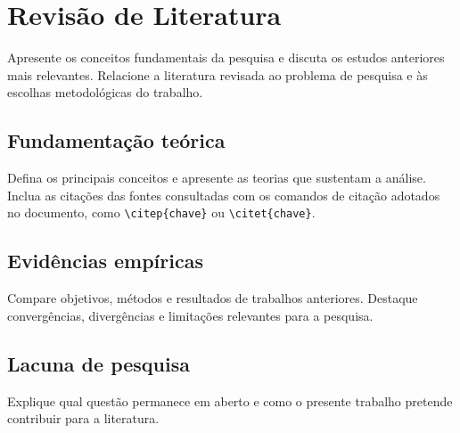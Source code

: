 \chapter{Revisão de Literatura}

Apresente os conceitos fundamentais da pesquisa e discuta os estudos anteriores
mais relevantes. Relacione a literatura revisada ao problema de pesquisa e às
escolhas metodológicas do trabalho.

\section{Fundamentação teórica}

Defina os principais conceitos e apresente as teorias que sustentam a análise.
Inclua as citações das fontes consultadas com os comandos de citação adotados no
documento, como \verb|\citep{chave}| ou \verb|\citet{chave}|.

\section{Evidências empíricas}

Compare objetivos, métodos e resultados de trabalhos anteriores. Destaque
convergências, divergências e limitações relevantes para a pesquisa.

\section{Lacuna de pesquisa}

Explique qual questão permanece em aberto e como o presente trabalho pretende
contribuir para a literatura.


